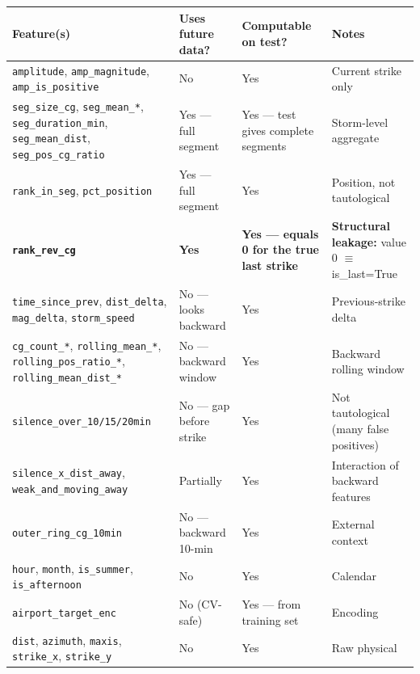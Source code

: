\documentclass[12pt,a4paper]{article}
\begin{document}
\begin{longtable}{L{3.8cm} C{2cm} C{2.2cm} L{4.5cm}}
\toprule
\textbf{Feature(s)} & \textbf{Uses future data?} & \textbf{Computable on test?} & \textbf{Notes} \\
\midrule
\texttt{amplitude}, \texttt{amp\_magnitude}, \texttt{amp\_is\_positive}
& No & Yes & Current strike only \\[4pt]

\texttt{seg\_size\_cg}, \texttt{seg\_mean\_*}, \texttt{seg\_duration\_min}, \texttt{seg\_mean\_dist}, \texttt{seg\_pos\_cg\_ratio}
& Yes --- full segment & Yes --- test gives complete segments & Storm-level aggregate \\[4pt]

\texttt{rank\_in\_seg}, \texttt{pct\_position}
& Yes --- full segment & Yes & Position, not tautological \\[4pt]

\textbf{\texttt{rank\_rev\_cg}}
& \textbf{Yes} & \textbf{Yes --- equals 0 for the true last strike}
& \textcolor{warningcolor}{\textbf{Structural leakage:}} value 0 $\equiv$ is\_last=True \\[4pt]

\texttt{time\_since\_prev}, \texttt{dist\_delta}, \texttt{mag\_delta}, \texttt{storm\_speed}
& No --- looks backward & Yes & Previous-strike delta \\[4pt]

\texttt{cg\_count\_*}, \texttt{rolling\_mean\_*}, \texttt{rolling\_pos\_ratio\_*}, \texttt{rolling\_mean\_dist\_*}
& No --- backward window & Yes & Backward rolling window \\[4pt]

\texttt{silence\_over\_10/15/20min}
& No --- gap before strike & Yes & Not tautological (many false positives) \\[4pt]

\texttt{silence\_x\_dist\_away}, \texttt{weak\_and\_moving\_away}
& Partially & Yes & Interaction of backward features \\[4pt]

\texttt{outer\_ring\_cg\_10min}
& No --- backward 10-min & Yes & External context \\[4pt]

\texttt{hour}, \texttt{month}, \texttt{is\_summer}, \texttt{is\_afternoon}
& No & Yes & Calendar \\[4pt]

\texttt{airport\_target\_enc}
& No (CV-safe) & Yes --- from training set & Encoding \\[4pt]

\texttt{dist}, \texttt{azimuth}, \texttt{maxis}, \texttt{strike\_x}, \texttt{strike\_y}
& No & Yes & Raw physical \\
\bottomrule
\end{longtable}
\end{document}
